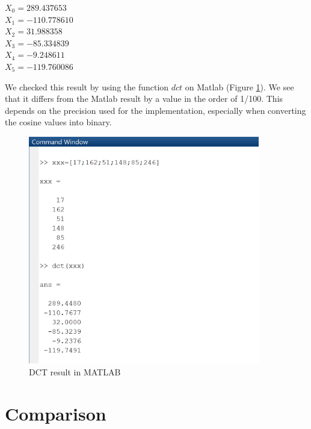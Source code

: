 \begin{center}
	 $ X_{0}=289.437653$\\$X_{1}=-110.778610$\\$X_{2}=31.988358$\\$X_{3}=-85.334839$
	 \\$X_{4}=-9.248611$\\$X_{5}=-119.760086 $
\end{center}
 We checked this result by using the function $ dct $ on Matlab (Figure \ref{fig:dct_res_mat}).
We see that it differs from the Matlab result by a value in the order of 1/100. This depends on the precision used for the implementation, especially when converting the cosine values into binary.
 




\begin{figure}[h!]
	\centering	
	\includegraphics[width=0.9\textwidth]{imm/dct/dct_res_matlab.png}  
	\caption{DCT result in MATLAB} 
	\label{fig:dct_res_mat}
\end{figure}

\clearpage
\section{Comparison}
